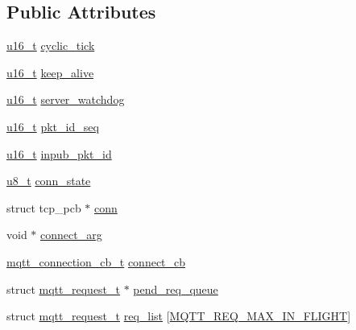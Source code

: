 \subsection*{Public Attributes}
\begin{DoxyCompactItemize}
\item 
\hyperlink{group__compiler__abstraction_ga77570ac4fcab86864fa1916e55676da2}{u16\+\_\+t} \hyperlink{structmqtt__client__t_a7faa0bf23ea59555ac197e92373eb5af}{cyclic\+\_\+tick}
\item 
\hyperlink{group__compiler__abstraction_ga77570ac4fcab86864fa1916e55676da2}{u16\+\_\+t} \hyperlink{structmqtt__client__t_a5d4e782a5ebce7f42909690a245e39cb}{keep\+\_\+alive}
\item 
\hyperlink{group__compiler__abstraction_ga77570ac4fcab86864fa1916e55676da2}{u16\+\_\+t} \hyperlink{structmqtt__client__t_aa0e3555ddd793ead6f731aa76c0eea6d}{server\+\_\+watchdog}
\item 
\hyperlink{group__compiler__abstraction_ga77570ac4fcab86864fa1916e55676da2}{u16\+\_\+t} \hyperlink{structmqtt__client__t_a0dcc0d539bc0418f3a5eb559a7f0bb1f}{pkt\+\_\+id\+\_\+seq}
\item 
\hyperlink{group__compiler__abstraction_ga77570ac4fcab86864fa1916e55676da2}{u16\+\_\+t} \hyperlink{structmqtt__client__t_aca6ec3ce9a992facc4f1e94492cff459}{inpub\+\_\+pkt\+\_\+id}
\item 
\hyperlink{group__compiler__abstraction_ga4caecabca98b43919dd11be1c0d4cd8e}{u8\+\_\+t} \hyperlink{structmqtt__client__t_a5823d082e96704fd7f6dac15cbeceb3b}{conn\+\_\+state}
\item 
struct tcp\+\_\+pcb $\ast$ \hyperlink{structmqtt__client__t_a1533a9954f57379bd378866ee0f01198}{conn}
\item 
void $\ast$ \hyperlink{structmqtt__client__t_a9ef6ed77466e88aad9cb465824d1c115}{connect\+\_\+arg}
\item 
\hyperlink{group__mqtt_ga8558743bdb7d599a93844fbc56c9029f}{mqtt\+\_\+connection\+\_\+cb\+\_\+t} \hyperlink{structmqtt__client__t_aefe3a47f733efa1219d1b9e234a39815}{connect\+\_\+cb}
\item 
struct \hyperlink{structmqtt__request__t}{mqtt\+\_\+request\+\_\+t} $\ast$ \hyperlink{structmqtt__client__t_a0a9d32364175d04db989c99f8e91f982}{pend\+\_\+req\+\_\+queue}
\item 
struct \hyperlink{structmqtt__request__t}{mqtt\+\_\+request\+\_\+t} \hyperlink{structmqtt__client__t_a5141cdf6c476c92ad21b5afa7e77ef99}{req\+\_\+list} \mbox{[}\hyperlink{group__mqtt__opts_gae82460b35de2291e9661e440c3458e8f}{M\+Q\+T\+T\+\_\+\+R\+E\+Q\+\_\+\+M\+A\+X\+\_\+\+I\+N\+\_\+\+F\+L\+I\+G\+HT}\mbox{]}

\end{DoxyCompactItemize}
